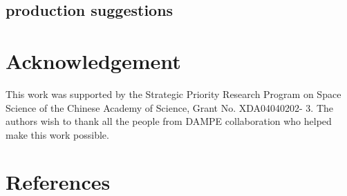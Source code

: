 \documentclass[5p, times]{elsarticle}
\begin{document}
\subsection{production suggestions}

\section*{Acknowledgement}
\label{sec:acknowledgement}

This work was supported by the Strategic Priority Research Program on Space Science of the Chinese Academy of Science,
Grant No. XDA04040202- 3. The authors wish to thank all the people from DAMPE collaboration who helped make this work
possible.

\section*{References}
\label{sec:reference}



\end{document}
